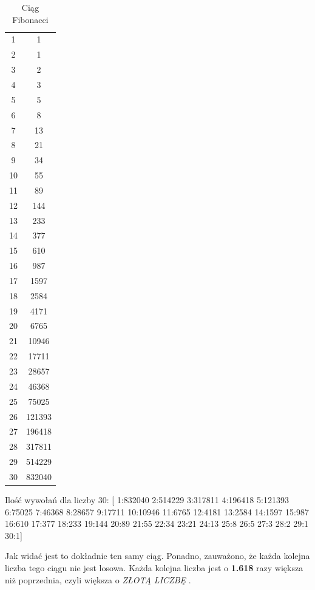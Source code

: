 \documentclass[12pt,a4paper]{article}
\begin{document}
\begin{table}[h]
    \centering
    \begin{tabular}{c|c}
         1 & 1  \\
         2 & 1 \\
         3 & 2 \\
         4 & 3\\
         5 & 5 \\
         6 & 8 \\
         7& 13 \\
         8& 21\\
         9&34\\
         10&55\\
         11&89\\
         12&144\\
         13&233\\
         14&377\\
         15&610\\
         16&987\\
         17&1597\\
         18&2584\\
         19&4171\\
         20&6765\\
         21&10946\\
         22&17711\\
         23&28657\\
         24&46368\\
         25&75025\\
         26&121393\\
         27&196418\\
         28&317811\\
         29&514229\\
         30&832040\\
    \end{tabular}
    \caption{Ciąg Fibonacci}
    \label{tab:cf}
\end{table}

\newpage

Ilość wywołań dla liczby 30:
[ 1:832040 2:514229 3:317811 4:196418 5:121393 6:75025 7:46368 8:28657 9:17711 10:10946 11:6765 12:4181 13:2584 14:1597 15:987 16:610 17:377 18:233 19:144 20:89 21:55 22:34 23:21 24:13 25:8 26:5 27:3 28:2 29:1 30:1]

Jak widać jest to dokładnie ten samy ciąg. Ponadno, zauważono, że każda kolejna liczba tego ciągu nie jest losowa. Każda kolejna liczba jest o \textbf{1.618} razy większa niż poprzednia, czyli większa o \textcolor{yellow!80!red} {\textit{ZŁOTĄ LICZBĘ} {\faGrinStars}}.
\end{document}
